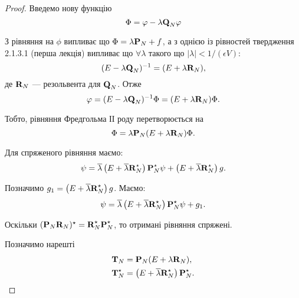 \begin{proof}
	Введемо нову функцію 
	\begin{equation}
		\Phi = \phi - \lambda \bf{Q}_N \phi
	\end{equation}

	З рівняння на $\phi$ випливає що $\Phi = \lambda \bf{P}_N + f$, а з однією із рівностей твердження 2.1.3.1 (перша лекція) %
	випливає що $\forall \lambda$ такого що $|\lambda| < 1 / (\epsilon V)$:
	\begin{equation}
		(E - \lambda \bf{Q}_N)^{-1} = (E + \lambda \bf{R}_N),
	\end{equation}
	де $\bf{R}_N$ --- резольвента для $\bf{Q}_N$. Отже
	\begin{equation}
		\phi = (E - \lambda \bf{Q}_N)^{-1} \Phi = (E + \lambda \bf{R}_N) \Phi.
	\end{equation}

	Тобто, рівняння Фредгольма ІІ роду перетворюється на 
	\begin{equation}
		\Phi = \lambda \bf{P}_N (E + \lambda \bf{R}_N) \Phi.
	\end{equation}

	Для спряженого рівняння маємо:
	\begin{equation}
		\psi = \overline \lambda \left(E + \overline \lambda \bf{R}_N^\star\right) \bf{P}_N^\star  \psi + \left(E + \overline \lambda \bf{R}_N^\star\right) g.
	\end{equation}

	Позначимо $g_1 = \left(E + \overline \lambda \bf{R}_N^\star\right) g$. Маємо:
	\begin{equation}
		\psi = \overline \lambda \left(E + \overline \lambda \bf{R}_N^\star\right) \bf{P}_N^\star  \psi + g_1.
	\end{equation}

	Оскільки $(\bf{P}_N \bf{R}_N)^\star  = \bf{R}_N^\star  \bf{P}_N^\star $, то отримані рівняння спряжені. \medskip

	Позначимо нарешті
	\begin{align}
		\bf{T}_N &= \bf{P}_N (E + \lambda \bf{R}_N), \\
		\bf{T}_N^\star &= \left(E + \overline \lambda \bf{R}_N^\star\right) \bf{P}_N^\star.
	\end{align}


\end{proof}
